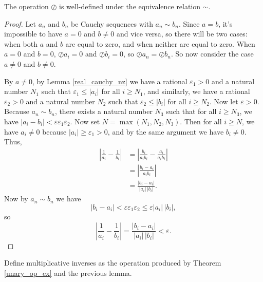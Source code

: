 \documentclass[../../math.tex]{subfiles}
\begin{document}
\begin{lemma}
    The operation $\oslash$ is well-defined under the equivalence relation
    $\sim$.
\end{lemma}
\begin{proof}
    Let $a_n$ and $b_n$ be Cauchy sequences with $a_n \sim b_n$.  Since $a = b$,
    it's impossible to have $a = 0$ and $b \neq 0$ and vice versa, so there will
    be two cases: when both $a$ and $b$ are equal to zero, and when neither are
    equal to zero.  When $a = 0$ and $b = 0$, $\oslash a_i = 0$ and $\oslash b_i
    = 0$, so $\oslash a_n = \oslash b_n$.  So now consider the case $a \neq 0$
    and $b \neq 0$.

    By $a \neq 0$, by Lemma \ref{real_cauchy_nz} we have a rational
    $\varepsilon_1 > 0$ and a natural number $N_1$ such that $\varepsilon_1 \leq
    |a_i|$ for all $i \geq N_1$, and similarly, we have a rational
    $\varepsilon_2 > 0$ and a natural number $N_2$ such that $\varepsilon_2 \leq
    |b_i|$ for all $i \geq N_2$.  Now let $\varepsilon > 0$.  Because $a_n \sim
    b_n$, there exists a natural number $N_3$ such that for all $i \geq N_3$, we
    have $|a_i - b_i| < \varepsilon \varepsilon_1 \varepsilon_2$.  Now set $N =
    \max(N_1, N_2, N_3)$.  Then for all $i \geq N$, we have $a_i \neq 0$ because
    $|a_i| \geq \varepsilon_1 > 0$, and by the same argument we have $b_i \neq
    0$.  Thus,
    \begin{align*}
        \left|\frac{1}{a_i} - \frac{1}{b_i}\right|
        &= \left|\frac{b_i}{a_ib_i} - \frac{a_i}{a_ib_i}\right| \\
        &= \left|\frac{b_i - a_i}{a_ib_i}\right| \\
        &= \frac{|b_i - a_i|}{|a_i|\,|b_i|}.
    \end{align*}
    Now by $a_n \sim b_n$ we have
    \[
        |b_i - a_i| < \varepsilon \varepsilon_1 \varepsilon_2
        \leq \varepsilon |a_i|\,|b_i|,
    \]
    so
    \[
        \left|\frac{1}{a_i} - \frac{1}{b_i}\right|
        = \frac{|b_i - a_i|}{|a_i|\,|b_i|}
        < \varepsilon.
    \]
\end{proof}

\begin{instance}
    Define multiplicative inverses as the operation produced by Theorem
    \ref{unary_op_ex} and the previous lemma.
\end{instance}
\end{document}
